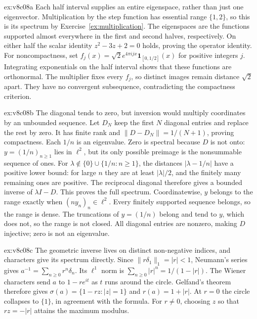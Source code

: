 \begin{solution}{ex:v8c08a}
\idea Each half interval supplies an entire eigenspace, rather than just one eigenvector.
\writeup Multiplication by the step function has essential range $\{1,2\}$, so this is its spectrum by Exercise~\ref{ex:multiplication}. The eigenspaces are the functions supported almost everywhere in the first and second halves, respectively. On either half the scalar identity $z^2-3z+2=0$ holds, proving the operator identity.
For noncompactness, set $f_j(x)=\sqrt2 e^{4\pi ijx}\mathbf1_{[0,1/2]}(x)$ for positive integers $j$. Integrating exponentials on the half interval shows that these functions are orthonormal. The multiplier fixes every $f_j$, so distinct images remain distance $\sqrt2$ apart. They have no convergent subsequence, contradicting the compactness criterion.
\end{solution}

\begin{solution}{ex:v8c08b}
\idea The diagonal tends to zero, but inversion would multiply coordinates by an unbounded sequence.
\writeup Let $D_N$ keep the first $N$ diagonal entries and replace the rest by zero. It has finite rank and $\|D-D_N\|=1/(N+1)$, proving compactness. Each $1/n$ is an eigenvalue. Zero is spectral because $D$ is not onto: $y=(1/n)_{n\ge1}$ lies in $\ell^2$, but its only possible preimage is the nonsummable sequence of ones.
For $\lambda\notin\{0\}\cup\{1/n:n\ge1\}$, the distances $|\lambda-1/n|$ have a positive lower bound: for large $n$ they are at least $|\lambda|/2$, and the finitely many remaining ones are positive. The reciprocal diagonal therefore gives a bounded inverse of $\lambda I-D$. This proves the full spectrum.
Coordinatewise, $y$ belongs to the range exactly when $(ny_n)_n\in\ell^2$. Every finitely supported sequence belongs, so the range is dense. The truncations of $y=(1/n)$ belong and tend to $y$, which does not, so the range is not closed. All diagonal entries are nonzero, making $D$ injective; zero is not an eigenvalue.
\end{solution}

\begin{solution}{ex:v8c08c}
\idea The geometric inverse lives on distinct non-negative indices, and characters give its spectrum directly.
\writeup Since $\|r\delta_1\|_1=|r|<1$, Neumann's series gives
$a^{-1}=\sum_{n\ge0}r^n\delta_n$.
Its $\ell^1$ norm is $\sum_{n\ge0}|r|^n=1/(1-|r|)$. The Wiener characters send $a$ to $1-re^{it}$ as $t$ runs around the circle. Gelfand's theorem therefore gives $\sigma(a)=\{1-rz:|z|=1\}$ and $r(a)=1+|r|$. At $r=0$ the circle collapses to $\{1\}$, in agreement with the formula. For $r\ne0$, choosing $z$ so that $rz=-|r|$ attains the maximum modulus.
\end{solution}

